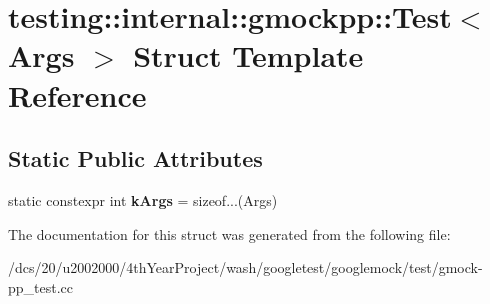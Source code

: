 \hypertarget{structtesting_1_1internal_1_1gmockpp_1_1Test}{}\section{testing\+:\+:internal\+:\+:gmockpp\+:\+:Test$<$ Args $>$ Struct Template Reference}
\label{structtesting_1_1internal_1_1gmockpp_1_1Test}
\subsection*{Static Public Attributes}
\begin{DoxyCompactItemize}
\item 
\mbox{\label{structtesting_1_1internal_1_1gmockpp_1_1Test_a512671a2e954747c6926227aeb27f5a0}} 
static constexpr int {\bfseries k\+Args} = sizeof...(Args)
\end{DoxyCompactItemize}


The documentation for this struct was generated from the following file\+:\begin{DoxyCompactItemize}
\item 
/dcs/20/u2002000/4th\+Year\+Project/wash/googletest/googlemock/test/gmock-\/pp\+\_\+test.\+cc\end{DoxyCompactItemize}
